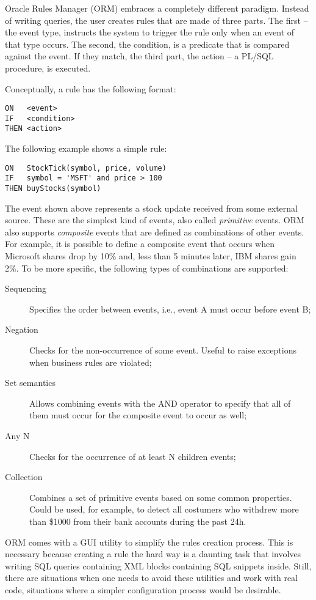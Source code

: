 \documentclass{report}
\begin{document}
Oracle Rules Manager (ORM) embraces a completely different paradigm. Instead of writing queries, the user creates rules that are made of three parts. The first -- the event type, instructs the system to trigger the rule only when an event of that type occurs. The second, the condition, is a predicate that is compared against the event. If they match, the third part, the action -- a PL/SQL procedure, is executed.

Conceptually, a rule has the following format:

\begin{verbatim}
ON   <event>
IF   <condition>
THEN <action>
\end{verbatim}

The following example shows a simple rule:

\begin{verbatim}
ON   StockTick(symbol, price, volume)
IF   symbol = 'MSFT' and price > 100
THEN buyStocks(symbol)
\end{verbatim}

The event shown above represents a stock update received from some external source. These are the simplest kind of events, also called \emph{primitive} events. ORM also supports \emph{composite} events that are defined as combinations of other events. For example, it is possible to define a composite event that occurs when Microsoft shares drop by 10\% and, less than 5 minutes later, IBM shares gain 2\%. To be more specific, the following types of combinations are supported:
\begin{description}
\item [Sequencing] Specifies the order between events, i.e., event A must occur before event B;
\item [Negation] Checks for the non-occurrence of some event. Useful to raise exceptions when business rules are violated;
\item [Set semantics] Allows combining events with the AND operator to specify that all of them must occur for the composite event to occur as well;
\item [Any N] Checks for the occurrence of at least N children events;
\item [Collection] Combines a set of primitive events based on some common properties. Could be used, for example, to detect all costumers who withdrew more than \$1000 from their bank accounts during the past 24h.
\end{description}

ORM comes with a GUI utility to simplify the rules creation process. This is necessary because creating a rule the hard way is a daunting task that involves writing SQL queries containing XML blocks containing SQL snippets inside. Still, there are situations when one needs to avoid these utilities and work with real code, situations where a simpler configuration process would be desirable.
\end{document}
